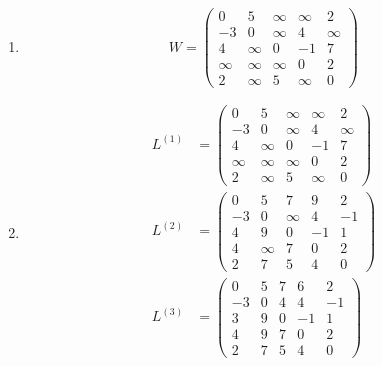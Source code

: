 \documentclass[11pt,a4paper]{article}
\begin{document}
\begin{loesung}
    \begin{enumerate}
        \item
        \begin{equation*}
            W = \begin{pmatrix}
                0 & 5 & \infty & \infty & 2 \\
                -3 & 0 & \infty & 4 & \infty \\
                4 & \infty & 0 & -1 & 7 \\
                \infty & \infty & \infty & 0 & 2 \\
                2 & \infty & 5 & \infty & 0 
            \end{pmatrix}
        \end{equation*}
        \item
        \begin{align*}
            L^{(1)} &= \begin{pmatrix}
                0 & 5 & \infty & \infty & 2 \\
                -3 & 0 & \infty & 4 & \infty \\
                4 & \infty & 0 & -1 & 7 \\
                \infty & \infty & \infty & 0 & 2 \\
                2 & \infty & 5 & \infty & 0
            \end{pmatrix} \\
            L^{(2)} &= \begin{pmatrix}
                0 & 5 & 7 & 9 & 2 \\
                -3 & 0 & \infty & 4 & -1 \\
                4 & 9 & 0 & -1 & 1 \\
                4 & \infty & 7 & 0 & 2 \\
                2 & 7 & 5 & 4 & 0
            \end{pmatrix} \\
            L^{(3)} &= \begin{pmatrix}
                0 & 5 & 7 & 6 & 2 \\
                -3 & 0 & 4 & 4 & -1 \\
                3 & 9 & 0 & -1 & 1 \\
                4 & 9 & 7 & 0 & 2 \\
                2 & 7 & 5 & 4 & 0
            \end{pmatrix} \\

\end{align*}
\end{enumerate}
\end{loesung}
\end{document}
